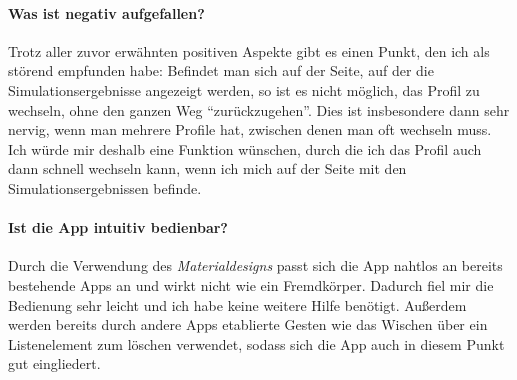 	\paragraph{Was ist negativ aufgefallen?}
	
		Trotz aller zuvor erwähnten positiven Aspekte gibt es einen Punkt, den ich als störend empfunden habe: Befindet man sich auf der Seite, auf der die Simulationsergebnisse angezeigt werden, so ist es nicht möglich, das Profil zu wechseln, ohne den ganzen Weg ``zurückzugehen''. Dies ist insbesondere dann sehr nervig, wenn man mehrere Profile hat, zwischen denen man oft wechseln muss. Ich würde mir deshalb eine Funktion wünschen, durch die ich das Profil auch dann schnell wechseln kann, wenn ich mich auf der Seite mit den Simulationsergebnissen befinde.
	
	\paragraph{Ist die App intuitiv bedienbar?}
		
		Durch die Verwendung des \textit{Materialdesigns} passt sich die App nahtlos an bereits bestehende Apps an und wirkt nicht wie ein Fremdkörper. Dadurch fiel mir die Bedienung sehr leicht und ich habe keine weitere Hilfe benötigt. Außerdem werden bereits durch andere Apps etablierte Gesten wie das Wischen über ein Listenelement zum löschen verwendet, sodass sich die App auch in diesem Punkt gut eingliedert.
		
